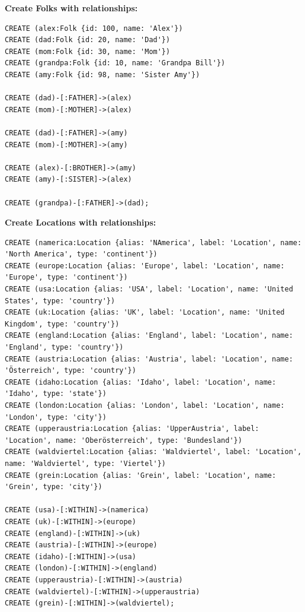 \documentclass[14pt,a4paper]{extarticle}
\begin{document}
	\noindent \textbf{Create Folks with relationships:}
	\begin{lstlisting}[style=sql]
CREATE (alex:Folk {id: 100, name: 'Alex'})
CREATE (dad:Folk {id: 20, name: 'Dad'})
CREATE (mom:Folk {id: 30, name: 'Mom'})
CREATE (grandpa:Folk {id: 10, name: 'Grandpa Bill'})
CREATE (amy:Folk {id: 98, name: 'Sister Amy'})

CREATE (dad)-[:FATHER]->(alex)
CREATE (mom)-[:MOTHER]->(alex)

CREATE (dad)-[:FATHER]->(amy)
CREATE (mom)-[:MOTHER]->(amy)

CREATE (alex)-[:BROTHER]->(amy)
CREATE (amy)-[:SISTER]->(alex)

CREATE (grandpa)-[:FATHER]->(dad);
	\end{lstlisting}

	\pagebreak

	\noindent \textbf{Create Locations with relationships:}
	\begin{lstlisting}[style=sql]
CREATE (namerica:Location {alias: 'NAmerica', label: 'Location', name: 'North America', type: 'continent'})
CREATE (europe:Location {alias: 'Europe', label: 'Location', name: 'Europe', type: 'continent'})
CREATE (usa:Location {alias: 'USA', label: 'Location', name: 'United States', type: 'country'})
CREATE (uk:Location {alias: 'UK', label: 'Location', name: 'United Kingdom', type: 'country'})
CREATE (england:Location {alias: 'England', label: 'Location', name: 'England', type: 'country'})
CREATE (austria:Location {alias: 'Austria', label: 'Location', name: 'Österreich', type: 'country'})
CREATE (idaho:Location {alias: 'Idaho', label: 'Location', name: 'Idaho', type: 'state'})
CREATE (london:Location {alias: 'London', label: 'Location', name: 'London', type: 'city'})
CREATE (upperaustria:Location {alias: 'UpperAustria', label: 'Location', name: 'Oberösterreich', type: 'Bundesland'})
CREATE (waldviertel:Location {alias: 'Waldviertel', label: 'Location', name: 'Waldviertel', type: 'Viertel'})
CREATE (grein:Location {alias: 'Grein', label: 'Location', name: 'Grein', type: 'city'})

CREATE (usa)-[:WITHIN]->(namerica)
CREATE (uk)-[:WITHIN]->(europe)
CREATE (england)-[:WITHIN]->(uk)
CREATE (austria)-[:WITHIN]->(europe)
CREATE (idaho)-[:WITHIN]->(usa)
CREATE (london)-[:WITHIN]->(england)
CREATE (upperaustria)-[:WITHIN]->(austria)
CREATE (waldviertel)-[:WITHIN]->(upperaustria)
CREATE (grein)-[:WITHIN]->(waldviertel);
	\end{lstlisting}

	\pagebreak
\end{document}
